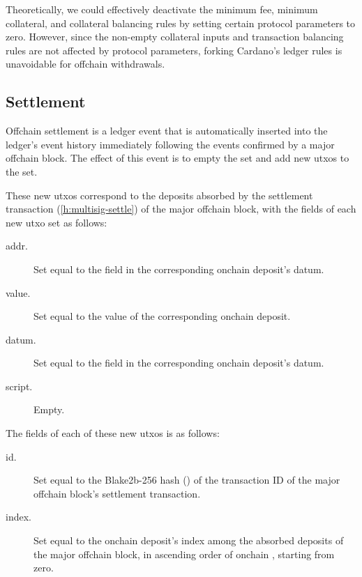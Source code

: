 \documentclass[../hydrozoa.tex]{subfiles}
\begin{document}
Theoretically, we could effectively deactivate the minimum fee, minimum collateral, and collateral balancing rules by setting certain protocol parameters to zero.
However, since the non-empty collateral inputs and transaction balancing rules are not affected by protocol parameters, forking Cardano's ledger rules is unavoidable for offchain withdrawals.

\subsection{Settlement}%
\label{h:ledger-settlement}

Offchain settlement is a ledger event that is automatically inserted into the ledger's event history immediately following the events confirmed by a major offchain block.
The effect of this event is to empty the  set and add new utxos to the  set.

These new utxos correspond to the deposits absorbed by the settlement transaction (\cref{h:multisig-settle}) of the major offchain block, with the  fields of each new utxo set as follows:
\begin{description}
  \item[addr.] Set equal to the  field in the corresponding onchain deposit's datum.
  \item[value.] Set equal to the value of the corresponding onchain deposit.
  \item[datum.] Set equal to the  field in the corresponding onchain deposit's datum.
  \item[script.] Empty.
\end{description}

The  fields of each of these new utxos is as follows:
\begin{description}
  \item[id.] Set equal to the Blake2b-256 hash () of the transaction ID of the major offchain block's settlement transaction.
  \item[index.] Set equal to the onchain deposit's index among the absorbed deposits of the major offchain block, in ascending order of onchain , starting from zero.
\end{description}
\end{document}
